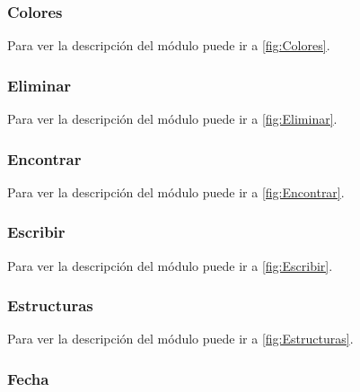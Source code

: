 \subsubsection{Colores}

Para ver la descripción del módulo puede ir a \ref{fig:Colores}.

\label{fig:ColoresCod}


\subsubsection{Eliminar}

Para ver la descripción del módulo puede ir a \ref{fig:Eliminar}.

\label{fig:EliminarCod}


\subsubsection{Encontrar}

Para ver la descripción del módulo puede ir a \ref{fig:Encontrar}.

\label{fig:EncontrarCod}


\subsubsection{Escribir}

Para ver la descripción del módulo puede ir a \ref{fig:Escribir}.

\label{fig:EscribirCod}


\subsubsection{Estructuras}

Para ver la descripción del módulo puede ir a \ref{fig:Estructuras}.

\label{fig:EstructurasCod}


\subsubsection{Fecha}

